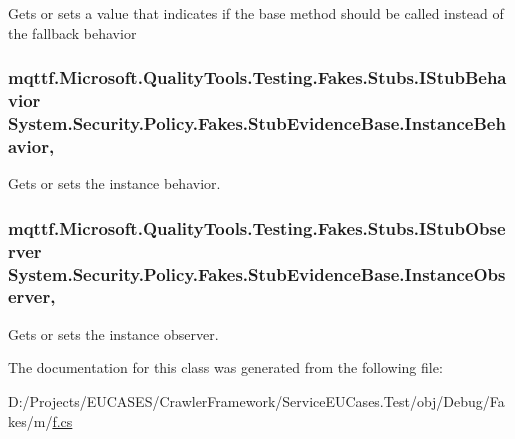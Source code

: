 Gets or sets a value that indicates if the base method should be called instead of the fallback behavior

\hypertarget{class_system_1_1_security_1_1_policy_1_1_fakes_1_1_stub_evidence_base_aeb5185e82b009d1575d1d4cffaa53332}{
\subsubsection[{Instance\-Behavior}]{\setlength{\rightskip}{0pt plus 5cm}mqttf.\-Microsoft.\-Quality\-Tools.\-Testing.\-Fakes.\-Stubs.\-I\-Stub\-Behavior System.\-Security.\-Policy.\-Fakes.\-Stub\-Evidence\-Base.\-Instance\-Behavior\hspace{0.3cm}{\ttfamily [get]}, {\ttfamily [set]}}}\label{class_system_1_1_security_1_1_policy_1_1_fakes_1_1_stub_evidence_base_aeb5185e82b009d1575d1d4cffaa53332}


Gets or sets the instance behavior.

\hypertarget{class_system_1_1_security_1_1_policy_1_1_fakes_1_1_stub_evidence_base_a774bdb3224d940b43f06c164aba1e622}{
\subsubsection[{Instance\-Observer}]{\setlength{\rightskip}{0pt plus 5cm}mqttf.\-Microsoft.\-Quality\-Tools.\-Testing.\-Fakes.\-Stubs.\-I\-Stub\-Observer System.\-Security.\-Policy.\-Fakes.\-Stub\-Evidence\-Base.\-Instance\-Observer\hspace{0.3cm}{\ttfamily [get]}, {\ttfamily [set]}}}\label{class_system_1_1_security_1_1_policy_1_1_fakes_1_1_stub_evidence_base_a774bdb3224d940b43f06c164aba1e622}


Gets or sets the instance observer.



The documentation for this class was generated from the following file\-:\begin{DoxyCompactItemize}
\item 
D\-:/\-Projects/\-E\-U\-C\-A\-S\-E\-S/\-Crawler\-Framework/\-Service\-E\-U\-Cases.\-Test/obj/\-Debug/\-Fakes/m/\hyperlink{m_2f_8cs}{f.\-cs}\end{DoxyCompactItemize}
